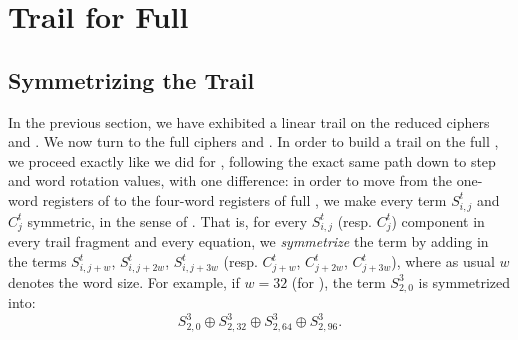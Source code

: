 \documentclass{llncs}
\begin{document}
\section{Trail for Full }

\subsection{Symmetrizing the Trail}
In the previous section, we have exhibited a linear trail on the reduced ciphers  and . We now turn to the full ciphers  and .
In order to build a trail on the full , we proceed exactly like we did for , following the exact same path down to step and word rotation values, with one difference: in order to move from the one-word registers of  to the four-word registers of full , we make every term $S^t_{i,j}$ and $C^t_j$ symmetric, in the sense of .
That is, for every $S^t_{i,j}$ (resp. $C^t_j$) component in every trail fragment and every equation, we \emph{symmetrize} the term by adding in the terms $S^t_{i,j+w}$, $S^t_{i,j+2w}$, $S^t_{i,j+3w}$ (resp. $C^t_{j+w}$, $C^t_{j+2w}$, $C^t_{j+3w}$), where as usual $w$ denotes the word size. For example, if $w=32$ (for ), the term $S^3_{2,0}$ is symmetrized into:
\[
S^3_{2,0} \oplus S^3_{2,32} \oplus S^3_{2,64} \oplus S^3_{2,96}.
\]
\end{document}
